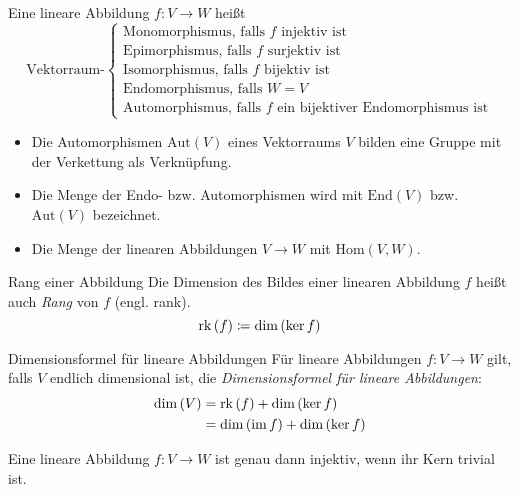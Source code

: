 \begin{definition}{}
  Eine lineare Abbildung $f: V\rightarrow W$ heißt
  \begin{equation*}
    \text{Vektorraum-}
    \begin{cases}
      \text{Monomorphismus, falls $f$ injektiv ist}\\
      \text{Epimorphismus, falls $f$ surjektiv ist}\\
      \text{Isomorphismus, falls $f$ bijektiv ist}\\
			\text{Endomorphismus, falls $W=V$}\\
			\text{Automorphismus, falls $f$ ein bijektiver Endomorphismus ist}
    \end{cases}
  \end{equation*}

  \bemerkung
	\begin{itemize}
		\item Die Automorphismen $\mathrm{Aut}(V)$ eines Vektorraums $V$ bilden eine Gruppe mit der Verkettung als Verknüpfung.
		\item Die Menge der Endo- bzw. Automorphismen wird mit $\mathrm{End}(V)$ bzw. $\mathrm{Aut}(V)$ bezeichnet.
		\item Die Menge der linearen Abbildungen $V\rightarrow W$ mit $\mathrm{Hom}(V,W)$.
	\end{itemize}
\end{definition}


\begin{definition}{Rang einer Abbildung}
  Die Dimension des Bildes einer linearen Abbildung $f$ heißt auch \emph{Rang} von $f$ (engl. rank).
  \begin{equation*}
    \mathrm{rk}\left(f\right) \coloneqq \mathrm{dim}\left(\mathrm{ker}\,f\right)
  \end{equation*}
\end{definition}

\begin{satz}{Dimensionsformel für lineare Abbildungen}
  Für lineare Abbildungen $f:V\rightarrow W$ gilt, falls $V$ endlich dimensional ist, die \emph{Dimensionsformel für lineare Abbildungen}:
  \begin{align*}
    \mathrm{dim}\left(V\right)&=\mathrm{rk}\left(f\right)+\mathrm{dim}\left(\mathrm{ker}\,f\right)\\
    &=\mathrm{dim}\left(\mathrm{im}\,f\right)+\mathrm{dim}\left(\mathrm{ker}\,f\right)
  \end{align*}
\end{satz}

\begin{lemma}{}
  Eine lineare Abbildung $f:V\rightarrow W$ ist genau dann injektiv, wenn ihr Kern trivial ist.
\end{lemma}
